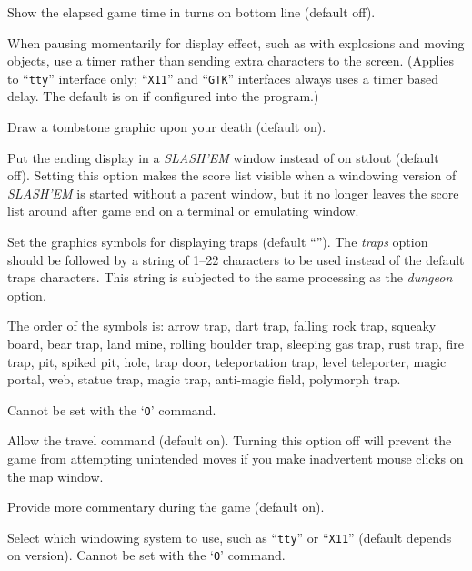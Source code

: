 \item[\ib{time}]
Show the elapsed game time in turns on bottom line (default off).

\item[\ib{timed\_delay}]
When pausing momentarily for display effect, such as with explosions and
moving objects, use a timer rather than sending extra characters to the
screen.  (Applies to ``{\tt tty}'' interface only; ``{\tt X11}'' and ``{\tt GTK}'' interfaces always
uses a timer based delay.  The default is on if configured into the
program.)

\item[\ib{tombstone}]
Draw a tombstone graphic upon your death (default on).

\item[\ib{toptenwin}]
Put the ending display in a {\it SLASH'EM\/} window instead of on stdout (default off).
Setting this option makes the score list visible when a windowing version
of {\it SLASH'EM\/} is started without a parent window, but it no longer leaves
the score list around after game end on a terminal or emulating window.

\item[\ib{traps}]
Set the graphics symbols for displaying traps
(default \relax{}``'').
The
{\it traps\/} 
option should be followed by a string of 1--22
characters to be used instead of the default traps characters.
This string is subjected to the same processing as the
{\it dungeon\/} 
option.

The order of the symbols is: 
arrow trap, dart trap, falling rock trap, squeaky board, bear trap,
land mine, rolling boulder trap, sleeping gas trap, rust trap, fire trap,
pit, spiked pit, hole, trap door, teleportation trap, level teleporter,
magic portal, web, statue trap, magic trap, anti-magic field, polymorph trap.

Cannot be set with the `{\tt O}' command.

\item[\ib{travel}]
Allow the travel command (default on).  Turning this option off will
prevent the game from attempting unintended moves if you make inadvertent
mouse clicks on the map window.

\item[\ib{verbose}]
Provide more commentary during the game (default on).

\item[\ib{windowtype}]
Select which windowing system to use, such as ``{\tt tty}'' or ``{\tt X11}''
(default depends on version).
Cannot be set with the `{\tt O}' command.

